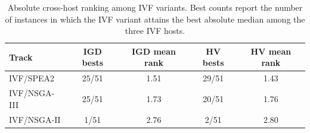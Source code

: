 \begin{table}[t]
\centering
\caption{Absolute cross-host ranking among IVF variants. Best counts report the number of instances in which the IVF variant attains the best absolute median among the three IVF hosts.}
\label{tab:cross_host_absolute}
\small
\begin{tabular}{lcccc}
\toprule
Track & IGD bests & IGD mean rank & HV bests & HV mean rank \\
\midrule
IVF/SPEA2 & 25/51 & 1.51 & 29/51 & 1.43 \\
IVF/NSGA-III & 25/51 & 1.73 & 20/51 & 1.76 \\
IVF/NSGA-II & 1/51 & 2.76 & 2/51 & 2.80 \\
\bottomrule
\end{tabular}
\end{table}
